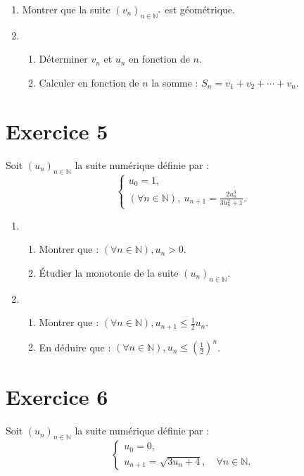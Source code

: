 \documentclass[12pt]{article}
\begin{document}
\begin{enumerate}
    \item Montrer que la suite \((v_n)_{n \in \mathbb{N}^*}\) est géométrique.

    \item 
    \begin{enumerate}
        \item Déterminer \(v_n\) et \(u_n\) en fonction de \(n\).
        \item Calculer en fonction de \(n\) la somme : \(S_n = v_1 + v_2 + \cdots + v_n\).
    \end{enumerate}
\end{enumerate}

\section*{Exercice 5}

Soit \((u_n)_{n \in \mathbb{N}}\) la suite numérique définie par :
\[
\begin{cases}
u_0 = 1, \\
(\forall n \in \mathbb{N}), \ u_{n+1} = \frac{2u_n^3}{3u_n^2 + 1}.
\end{cases}
\]

\begin{enumerate}
    \item 
    \begin{enumerate}
        \item Montrer que : \((\forall n \in \mathbb{N}), u_n > 0\).
        \item Étudier la monotonie de la suite \((u_n)_{n \in \mathbb{N}}\).
    \end{enumerate}

    \item 
    \begin{enumerate}
        \item Montrer que : \((\forall n \in \mathbb{N}), u_{n+1} \leq \frac{1}{2} u_n\).
        \item En déduire que : \((\forall n \in \mathbb{N}), u_n \leq \left(\frac{1}{2}\right)^n\).
    \end{enumerate}
\end{enumerate}

\section*{Exercice 6}

Soit \((u_n)_{n \in \mathbb{N}}\) la suite numérique définie par :
\[
\begin{cases}
u_0 = 0, \\
u_{n+1} = \sqrt{3u_n + 4}, \quad \forall n \in \mathbb{N}.
\end{cases}
\]
\end{document}
